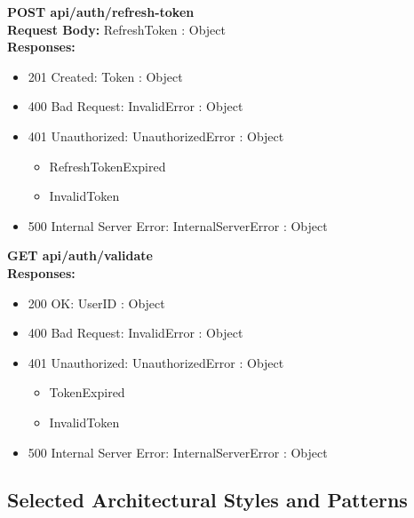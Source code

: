 \noindent\textbf{\color{titleColor}POST api/auth/refresh-token}
\vspace{2pt}
\\\textbf{\color{titleColor}Request Body:} RefreshToken : Object 
\vspace{4pt}
\\\textbf{\color{titleColor}Responses:} 
\begin{itemize}
    \item {\color{titleColor}201 Created:} Token : Object
    \item {\color{titleColor}400 Bad Request:} InvalidError : Object
    \item {\color{titleColor}401 Unauthorized:} UnauthorizedError : Object
    \begin{itemize}
        \item RefreshTokenExpired
        \item InvalidToken
    \end{itemize}
    \item {\color{titleColor}500 Internal Server Error:} InternalServerError : Object
\end{itemize}
\vspace{10pt}
\noindent{\color{titleColor}\rule{0.8\linewidth}{0.2mm}}
\vspace{10pt}

\noindent\textbf{\color{titleColor}GET api/auth/validate}
\vspace{2pt}
\\\textbf{\color{titleColor}Responses:} 
\begin{itemize}
    \item {\color{titleColor}200 OK:} UserID : Object
    \item {\color{titleColor}400 Bad Request:} InvalidError : Object
    \item {\color{titleColor}401 Unauthorized:} UnauthorizedError : Object
    \begin{itemize}
        \item TokenExpired
        \item InvalidToken
    \end{itemize}
    \item {\color{titleColor}500 Internal Server Error:} InternalServerError : Object
\end{itemize}
\vspace{10pt}
\noindent{\color{titleColor}\rule{0.8\linewidth}{0.2mm}}
\vspace{10pt}
\subsection{Selected Architectural Styles and Patterns}

